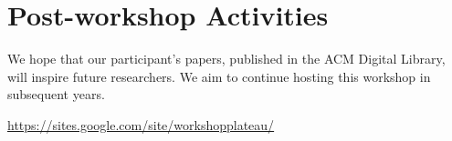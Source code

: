 \documentclass[10pt]{sigplanconf}
\begin{document}
\section{Post-workshop Activities}

We hope that our participant's papers, published in the ACM Digital Library, will inspire future researchers. We aim to continue hosting this workshop in subsequent years.

\begin{thebibliography}{1}

 \url{https://sites.google.com/site/workshopplateau/}
\end{thebibliography}
\end{document}

